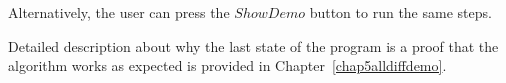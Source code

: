 \documentclass{l4proj}
\begin{document}
\begin{appendices}
\noindent Alternatively, the user can press the $Show Demo$ button to run the same steps.

\noindent Detailed description about why the last state of the program is a proof that the algorithm works as expected is provided in Chapter~\ref{chap5alldiffdemo}.
\end{appendices}


%
%
\printbibliography
\end{document}
